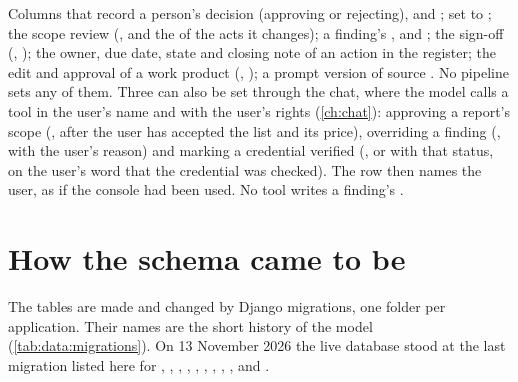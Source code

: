 \begin{humanbox}{Columns that record a person's decision}
 (approving or rejecting),  and ;
 set to ; the scope review
(, and the  of the acts it changes); a
finding's ,  and ; the sign-off
(, ); the owner, due date, state and closing note
of an action in the register; the edit and approval of a work product (,
); a prompt version of source . No pipeline sets any of them.
Three can also be set through the chat, where the model calls a tool in the user's name and
with the user's rights (\cref{ch:chat}): approving a report's scope (,
after the user has accepted the list and its price), overriding a finding
(, with the user's reason) and marking a credential verified
(, or  with that status, on the user's word that the
credential was checked). The row then names the user, as if the console had been used. No
tool writes a finding's .
\end{humanbox}

\section{How the schema came to be}\label{sec:data:history}

The tables are made and changed by Django migrations,
one folder per application. Their names are the short history of the model
(\cref{tab:data:migrations}). On 13 November 2026 the live database stood at the last migration
listed here for , , , , ,
, , , ,  and .

